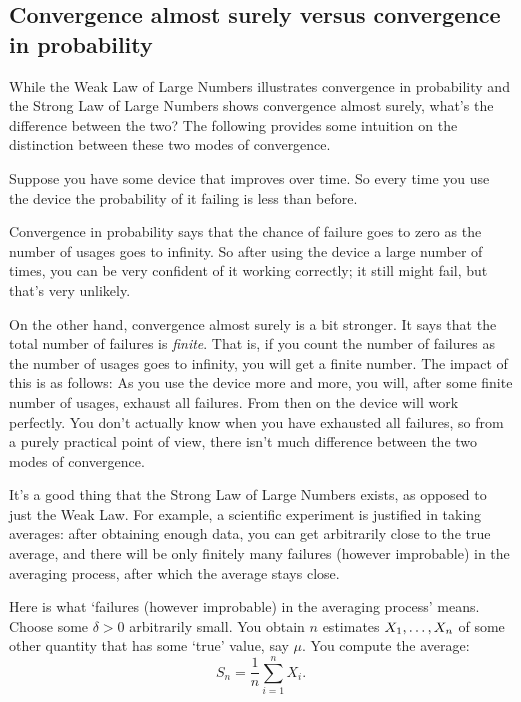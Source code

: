 \subsection{Convergence almost surely versus convergence in probability}

While the Weak Law of Large Numbers illustrates convergence in probability and the Strong Law of Large Numbers shows convergence almost surely, what's the difference between the two?
The following provides some intuition on the distinction between these two modes of convergence.

Suppose you have some device that improves over time.
So every time you use the device the probability of it failing is less than before.

Convergence in probability says that the chance of failure goes to zero as the number of usages goes to infinity.
So after using the device a large number of times, you can be very confident of it working correctly; it still might fail, but that's very unlikely.

On the other hand, convergence almost surely is a bit stronger.
It says that the total number of failures is \textit{finite}.
That is, if you count the number of failures as the number of usages goes to infinity, you will get a finite number.
The impact of this is as follows: As you use the device more and more, you will, after some finite number of usages, exhaust all failures.
From then on the device will work perfectly.
You don't actually know when you have exhausted all failures, so from a purely practical point of view, there isn't much difference between the two modes of convergence.

It's a good thing that the Strong Law of Large Numbers exists, as opposed to just the Weak Law.
For example, a scientific experiment is justified in taking averages: after obtaining enough data, you can get arbitrarily close to the true average, and there will be only finitely many failures (however improbable) in the averaging process, after which the average stays close.

Here is what `failures (however improbable) in the averaging process' means.
Choose some $\delta > 0$ arbitrarily small.
You obtain $n$ estimates $X_1, \ldots, X_n$ of some other quantity that has some `true' value, say $\mu$.
You compute the average:
\[
S_n = \frac{1}{n} \sum_{i = 1}^n X_i.
\]

